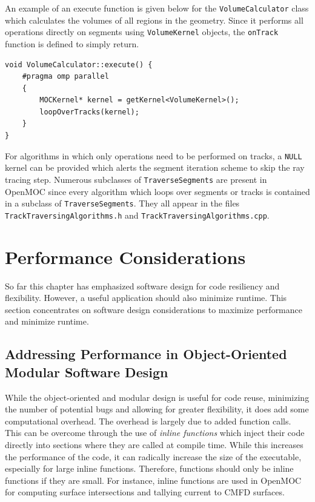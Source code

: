 An example of an execute function is given below for the \texttt{VolumeCalculator} class which calculates the volumes of all regions in the geometry. Since it performs all operations directly on segments using \texttt{VolumeKernel} objects, the \texttt{onTrack} function is defined to simply return.

\begin{center}
\begin{lstlisting}
void VolumeCalculator::execute() {
	#pragma omp parallel
	{
		MOCKernel* kernel = getKernel<VolumeKernel>();
		loopOverTracks(kernel);
	}
}
\end{lstlisting}
\end{center}

For algorithms in which only operations need to be performed on tracks, a \texttt{NULL} kernel can be provided which alerts the segment iteration scheme to skip the ray tracing step. Numerous subclasses of \texttt{TraverseSegments} are present in OpenMOC since every algorithm which loops over segments or tracks is contained in a subclass of \texttt{TraverseSegments}. They all appear in the files \texttt{TrackTraversingAlgorithms.h} and \texttt{TrackTraversingAlgorithms.cpp}.

\section{Performance Considerations}
\label{sec:software-performance-considerations}

So far this chapter has emphasized software design for code resiliency and flexibility. However, a useful application should also minimize runtime. This section concentrates on software design considerations to maximize performance and minimize runtime.

\subsection{Addressing Performance in Object-Oriented Modular Software Design}

While the object-oriented and modular design is useful for code reuse, minimizing the number of potential bugs and allowing for greater flexibility, it does add some computational overhead. The overhead is largely due to added function calls. This can be overcome through the use of \textit{inline functions} which inject their code directly into sections where they are called at compile time. While this increases the performance of the code, it can radically increase the size of the executable, especially for large inline functions. Therefore, functions should only be inline functions if they are small. For instance, inline functions are used in OpenMOC for computing surface intersections and tallying current to CMFD surfaces. 

